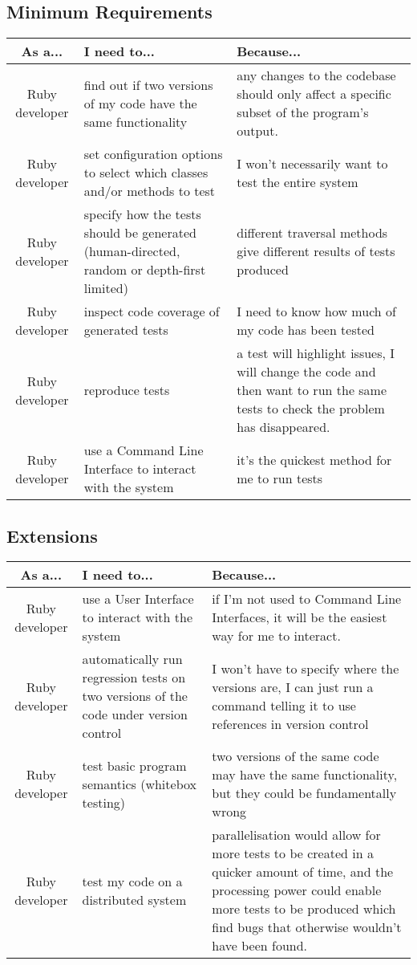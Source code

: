\documentclass{report}
\begin{document}
\subsection{Minimum Requirements}
\begin{tabular}{| c | p{5cm} | p{5cm} |}
\hline
\textbf{As a...} & \textbf{I need to...} & \textbf{Because...} \\
\hline
Ruby developer & find out if two versions of my code have the same functionality & any changes to the codebase should only affect a specific subset of the program’s output. \\
\hline
Ruby developer & set configuration options to select which classes and/or methods to test & I won't necessarily want to test the entire system \\
\hline
Ruby developer & specify how the tests should be generated (human-directed, random or depth-first limited) & different traversal methods give different results of tests produced \\
Ruby developer & inspect code coverage of generated tests & I need to know how much of my code has been tested \\
\hline
Ruby developer & reproduce tests & a test will highlight issues, I will change the code and then want to run the same tests to check the problem has disappeared. \\
\hline
Ruby developer & use a Command Line Interface to interact with the system & it's the quickest method for me to run tests \\
\hline
\end{tabular}
\subsection{Extensions}
\begin{tabular}{| c | p{5cm} | p{5cm} |}
\hline
\textbf{As a...} & \textbf{I need to...} & \textbf{Because...} \\
\hline
Ruby developer & use a User Interface to interact with the system & if I'm not used to Command Line Interfaces, it will be the easiest way for me to interact. \\
\hline
Ruby developer & automatically run regression tests on two versions of the code under version control & I won't have to specify where the versions are, I can just run a command telling it to use references in version control \\
\hline
Ruby developer & test basic program semantics (whitebox testing) & two versions of the same code may have the same functionality, but they could be fundamentally wrong \\
\hline
Ruby developer & test my code on a distributed system & parallelisation would allow for more tests to be created in a quicker amount of time, and the processing power could enable more tests to be produced which find bugs that otherwise wouldn't have been found. \\
\hline
\end{tabular}
\end{document}
